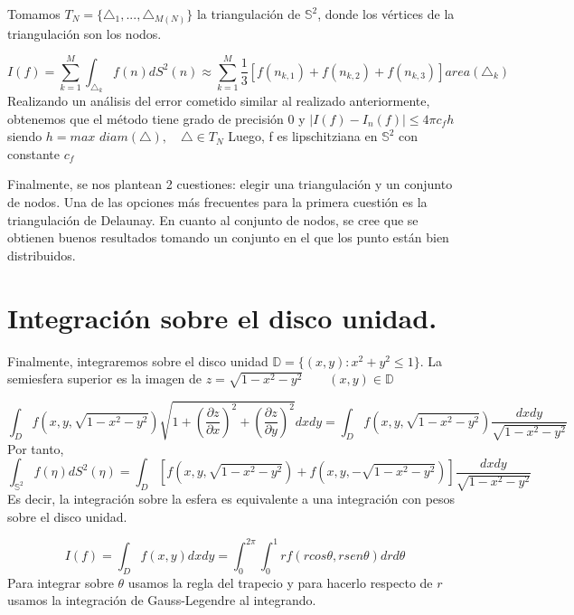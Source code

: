 \medskip
Tomamos $T_N=\{\triangle_1,...,\triangle_{M(N)}\}$ la triangulación de $\mathds{S}^2$, donde los vértices de la triangulación son los nodos.

$$
I(f) = \sum_{k=1}^{M} \int_{\triangle_k} f(n)dS^2(n) \approx  \sum_{k=1}^{M} \frac{1}{3}[f(n_{k,1})+f(n_{k,2})+f(n_{k,3})] area(\triangle_k)
$$
Realizando un análisis del error cometido similar al realizado anteriormente, obtenemos que el método tiene grado de precisión 0 y 
$|I(f)-I_n(f)|\le 4\pi c_f h$ siendo $h=max$ $diam(\triangle), \quad \triangle\in T_N$
Luego, f es lipschitziana en $\mathds{S}^2$ con constante $ c_f$

Finalmente, se nos plantean 2 cuestiones: elegir una triangulación y un conjunto de nodos. Una de las opciones más frecuentes para la primera cuestión es la triangulación de Delaunay. En cuanto al conjunto de nodos, se cree que se obtienen buenos resultados tomando un conjunto en el que los punto están bien distribuidos.

\section{Integración sobre el disco unidad.}
Finalmente, integraremos sobre el disco unidad $\mathds{D}=\{(x,y):x^2+y^2 \le 1\}.$
La semiesfera superior es la imagen de 
$z=\sqrt{1-x^2-y^2} \qquad (x,y)\in \mathds{D}$

$$\int_{D}f(x,y,\sqrt{1-x^2-y^2})\sqrt{1+(\frac{\partial z}{\partial x})^2+(\frac{\partial z}{\partial y})^2} dx dy = \int_D f(x,y,\sqrt{1-x^2-y^2})\frac{dx dy}{\sqrt{1-x^2-y^2}}$$
Por tanto,
$$ \int_{\mathds{S}^2}f(\eta) dS^2(\eta) = \int_D \left[f(x,y,\sqrt{1-x^2-y^2})+f(x,y,-\sqrt{1-x^2-y^2})\right]\frac{dx dy}{\sqrt{1-x^2-y^2}} $$
Es decir, la integración sobre la esfera es equivalente a una integración con pesos sobre el disco unidad.


$$I(f)=\int_{D} f(x,y) dxdy = \int_{0}^{2\pi}\int_{0}^{1} rf(rcos\theta,rsen\theta)drd\theta $$
Para integrar sobre $\theta$ usamos la regla del trapecio y para hacerlo respecto de $r$ usamos la integración de Gauss-Legendre al integrando.

